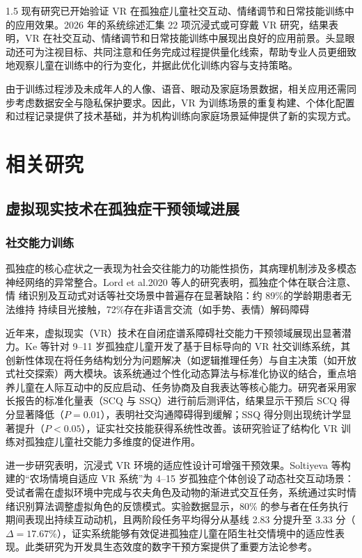 \documentclass[zihao=-4]{ctexart}
\begin{document}
\begin{spacing}{1.5}
现有研究已开始验证 VR 在孤独症儿童社交互动、情绪调节和日常技能训练中的应用效果。2026 年的系统综述汇集 22 项沉浸式或可穿戴 VR 研究，结果表明，VR 在社交互动、情绪调节和日常技能训练中展现出良好的应用前景\cite{ref16}。头显眼动还可为注视目标、共同注意和任务完成过程提供量化线索，帮助专业人员更细致地观察儿童在训练中的行为变化，并据此优化训练内容与支持策略\cite{ref17}。

由于训练过程涉及未成年人的人像、语音、眼动及家庭场景数据，相关应用还需同步考虑数据安全与隐私保护要求\cite{ref18}。因此，VR 为训练场景的重复构建、个体化配置和过程记录提供了技术基础，并为机构训练向家庭场景延伸提供了新的实现方式。

\section{相关研究}

\subsection{虚拟现实技术在孤独症干预领域进展}

\subsubsection{社交能力训练}

孤独症的核心症状之一表现为社会交往能力的功能性损伤，其病理机制涉及多模态 神经网络的异常整合\cite{ref19}。Lord et al.2020 等人的研究表明，孤独症个体在联合注意、情 绪识别及互动式对话等社交场景中普遍存在显著缺陷：约 89\%的学龄期患者无法维持 持续目光接触，72\%存在非语言交流（如手势、表情）解码障碍\cite{ref20}

近年来，虚拟现实（VR）技术在自闭症谱系障碍社交能力干预领域展现出显著潜力。Ke 等针对 9--11 岁孤独症儿童开发了基于目标导向的 VR 社交训练系统\cite{ref21}，其创新性体现在将任务结构划分为问题解决（如逻辑推理任务）与自主决策（如开放式社交探索）两大模块。该系统通过个性化动态算法与标准化协议的结合，重点培养儿童在人际互动中的反应启动、任务协商及自我表达等核心能力。研究者采用家长报告的标准化量表（SCQ 与 SSQ）进行前后测评估，结果显示干预后 SCQ 得分显著降低（$P=0.01$），表明社交沟通障碍得到缓解；SSQ 得分则出现统计学显著提升（$P<0.05$），证实社交技能获得系统性改善。该研究验证了结构化 VR 训练对孤独症儿童社交能力多维度的促进作用。

进一步研究表明，沉浸式 VR 环境的适应性设计可增强干预效果。Soltiyeva 等构建的“农场情境自适应 VR 系统”为 4--15 岁孤独症个体创设了动态社交互动场景\cite{ref22}：受试者需在虚拟环境中完成与农夫角色及动物的渐进式交互任务，系统通过实时情绪识别算法调整虚拟角色的反馈模式。实验数据显示，80\% 的参与者在任务执行期间表现出持续互动动机，且两阶段任务平均得分从基线 2.83 分提升至 3.33 分（$\Delta=17.67\%$），证实系统能够有效促进孤独症儿童在陌生社交情境中的适应性表现。此类研究为开发具生态效度的数字干预方案提供了重要方法论参考。


\end{spacing}
\end{document}
